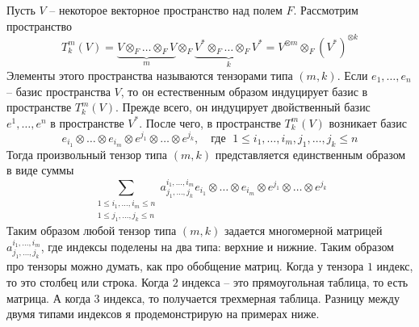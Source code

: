 Пусть $V$ -- некоторое векторное пространство над полем $F$. Рассмотрим пространство
\[
T^m_k(V) = \underbrace{V\otimes_F \ldots \otimes_F V}_{m}\otimes_F\underbrace{V^*\otimes_F \ldots \otimes_F V^*}_{k} = V^{\otimes m}\otimes_F(V^*)^{\otimes k}
\]
Элементы этого пространства называются тензорами типа $(m, k)$. Если $e_1,\ldots,e_n$ -- базис пространства $V$, то он естественным образом индуцирует базис в пространстве $T^m_k(V)$. Прежде всего, он индуцирует двойственный базис $e^1,\ldots,e^n$ в пространстве $V^*$. После чего, в пространстве $T^m_k(V)$ возникает базис
\[
e_{i_1}\otimes \ldots \otimes e_{i_m}\otimes e^{j_1}\otimes \ldots \otimes e^{j_k},\quad\text{где }\; 1\leqslant i_1,\ldots,i_m,j_1,\ldots,j_k \leqslant n
\]
Тогда произвольный тензор типа $(m,k)$ представляется единственным образом в виде суммы
\[
\sum_{\substack{1\leqslant i_1,\ldots,i_m\leqslant n\\1\leqslant j_1,\ldots,j_k\leqslant n}} a^{i_1,\ldots,i_m}_{j_1,\ldots,j_k}e_{i_1}\otimes \ldots \otimes e_{i_m}\otimes e^{j_1}\otimes \ldots \otimes e^{j_k}
\]
Таким образом любой тензор типа $(m,k)$ задается многомерной матрицей $a^{i_1,\ldots,i_m}_{j_1,\ldots,j_k}$, где индексы поделены на два типа: верхние и нижние. Таким образом про тензоры можно думать, как про обобщение матриц. Когда у тензора $1$ индекс, то это столбец или строка. Когда $2$ индекса -- это прямоугольная таблица, то есть матрица. А когда $3$ индекса, то получается трехмерная таблица. Разницу между двумя типами индексов я продемонстрирую на примерах ниже.

